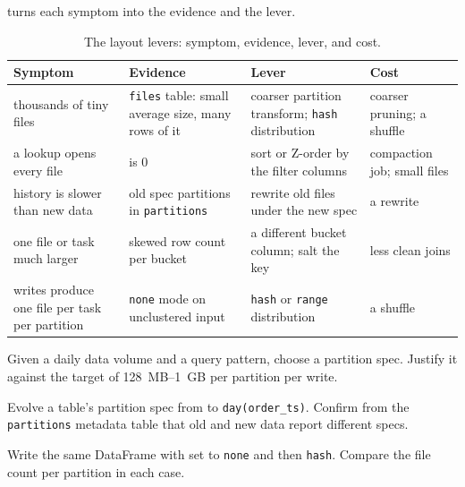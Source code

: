  turns each symptom into the evidence and the lever.

\begin{table}[htbp]
\centering\footnotesize
\renewcommand{\arraystretch}{1.25}
\begin{tabular}{@{}P{3.3cm}P{3.9cm}P{3.7cm}P{3.1cm}@{}}
\toprule
\textbf{Symptom} & \textbf{Evidence} & \textbf{Lever} & \textbf{Cost} \\
\midrule
thousands of tiny files & \texttt{files} table: small average size, many rows of it & coarser partition transform; \texttt{hash} distribution & coarser pruning; a shuffle \\
a lookup opens every file &  is 0 & sort or Z-order by the filter columns & compaction job; small files \\
history is slower than new data & old spec partitions in \texttt{partitions} & rewrite old files under the new spec & a rewrite \\
one file or task much larger & skewed row count per bucket & a different bucket column; salt the key & less clean joins \\
writes produce one file per task per partition & \texttt{none} mode on unclustered input & \texttt{hash} or \texttt{range} distribution & a shuffle \\
\bottomrule
\end{tabular}
\caption{The layout levers: symptom, evidence, lever, and cost.}
\label{tab:ice-layout-levers}
\end{table}

\exercisehead
\begin{exercises}
\item Given a daily data volume and a query pattern, choose a partition spec.
      Justify it against the target of 128~MB--1~GB per partition per write.
\item Evolve a table's partition spec from  to
      \texttt{day(order\_ts)}. Confirm from the \texttt{partitions} metadata
      table that old and new data report different specs.
\item Write the same DataFrame with  set to
      \texttt{none} and then \texttt{hash}. Compare the file count per
      partition in each case.
\end{exercises}

